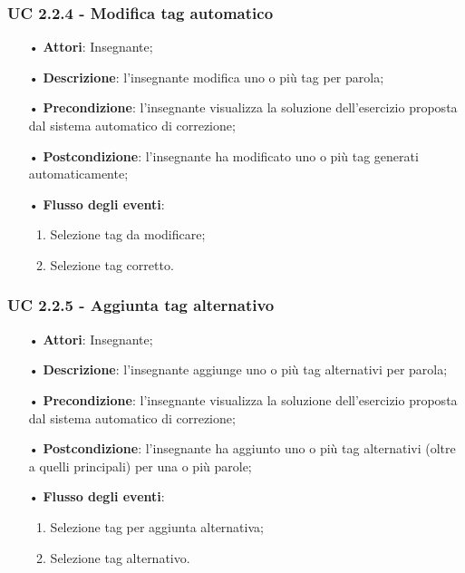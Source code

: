 \subsubsection{UC 2.2.4 - Modifica tag automatico}
\begin{itemize}
	\item[•] \textbf{Attori}: Insegnante;
	\item[•] \textbf{Descrizione}: l'insegnante modifica uno o più tag per parola;
	\item[•] \textbf{Precondizione}: l'insegnante visualizza la soluzione dell'esercizio proposta dal sistema automatico di correzione;
	\item[•] \textbf{Postcondizione}: l'insegnante ha modificato uno o più tag generati automaticamente;
\item[•] \textbf{Flusso degli eventi}:
\begin{enumerate}
		\item Selezione tag da modificare;
		\item Selezione tag corretto.
\end{enumerate}
\end{itemize}

\subsubsection{UC 2.2.5 - Aggiunta tag alternativo}
\begin{itemize}
	\item[•] \textbf{Attori}: Insegnante;
	\item[•] \textbf{Descrizione}: l'insegnante aggiunge uno o più tag alternativi per parola;
	\item[•] \textbf{Precondizione}: l'insegnante visualizza la soluzione dell'esercizio proposta dal sistema automatico di correzione;
	\item[•] \textbf{Postcondizione}: l'insegnante ha aggiunto uno o più tag alternativi (oltre a quelli principali) per una o più parole;
\item[•] \textbf{Flusso degli eventi}:
\begin{enumerate}
		\item Selezione tag per aggiunta alternativa;
		\item Selezione tag alternativo.
\end{enumerate}
\end{itemize}


